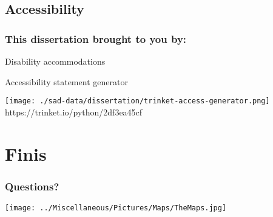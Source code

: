 \documentclass[14pt]{beamer}
\begin{document}
\subsection{Accessibility}
\begin{frame}[t]{}
\frametitle{This dissertation brought to you by:}
\begin{large}
Disability accommodations\\
\end{large}
Accessibility statement generator
\begin{center}
\texttt{[image: ./sad-data/dissertation/trinket-access-generator.png]}\\
https://trinket.io/python/2df3ea45cf
\end{center}
\end{frame}

\section{Finis}
\begin{frame}[t]
\frametitle{Questions?}
\begin{center}
\texttt{[image: ../Miscellaneous/Pictures/Maps/TheMaps.jpg]}
\end{center}
\end{frame}
\end{document}

